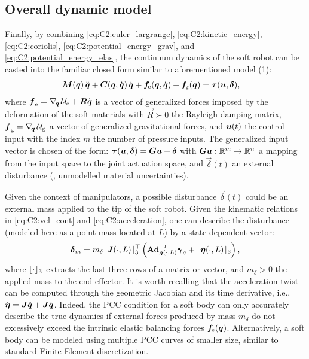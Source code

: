 \subsection{Overall dynamic model}
\noindent Finally, by combining \eqref{eq:C2:euler_largrange}, \eqref{eq:C2:kinetic_energy}, \eqref{eq:C2:coriolis}, \eqref{eq:C2:potential_energy_grav}, and \eqref{eq:C2:potential_energy_elas}, the continuum dynamics of the soft robot can be casted into the familiar closed form
\cite{DellaSantina2020,Boyer2021,Renda2018} similar to aforementioned model (1):
%
\begin{align}
\boldsymbol{M}({\boldsymbol{q}})\,{\ddot{\boldsymbol{q}}} + \boldsymbol{C}({\boldsymbol{q}},{\dot{\boldsymbol{q}}})\,{\dot{\boldsymbol{q}}} + {\boldsymbol{f}}\!_{\scriptstyle\textrm{e}}({\boldsymbol{q}},{\dot{\boldsymbol{q}}}) + {\boldsymbol{f}}\!_{\scriptstyle\textrm{g}}({\boldsymbol{q}}) & = \boldsymbol{\tau}({\boldsymbol{u}},\boldsymbol{\delta}),
\label{eq:C2:dynamic_model}
\end{align}
%
where ${\boldsymbol{f}}_{\scriptstyle\textrm{e}} = \nabla_{\!{\boldsymbol{q}}}\,\mathcal{U}_{\textrm{e}} + \boldsymbol{R}{\dot{\boldsymbol{q}}}$ is a vector of generalized forces imposed by the deformation of the soft materials with $\vec{R} \succ 0$ the Rayleigh damping matrix,
$\boldsymbol{f}_{\scriptstyle\textrm{g}} = \nabla_{\!{\boldsymbol{q}}}\, \mathcal{U}_{\scriptstyle\textrm{g}}$ a vector of generalized gravitational forces, and
${\boldsymbol{u}}(t)$ the control input with the index
$m$ the number of pressure inputs. The generalized input vector is chosen of the form:
$\boldsymbol{\tau}({\boldsymbol{u}},\boldsymbol{\delta}) = \boldsymbol{G}{\boldsymbol{u}} + \boldsymbol{\delta}$ with $\boldsymbol{G} {\boldsymbol{u}}: \mathbb{R}^m \to \mathbb{R}^n$ a mapping from the input space to the joint actuation space, and $\vec{\delta}(t)$ an external disturbance (\eg, unmodelled material uncertainties).
%
\begin{rmk}
Given the context of manipulators, a possible disturbance $\vec{\delta}(t)$ could be an external mass applied to the tip of the soft robot. Given the kinematic relations in \eqref{eq:C2:vel_cont} and \eqref{eq:C2:acceleration}, one can describe the disturbance (modeled here as a point-mass located at $L$) by a state-dependent vector:
%
\begin{equation}
\vec{\delta}_m = m_\delta \floor{\JB(\cdot,L)}_3^\top\left({\normalfont \Ad}_{\gB(\cdot,L)}\inv\gammaB_g + \floor{\dot{\etaB}(\cdot,L)}_3 \right),
\label{eq:delta_payload}
\end{equation}
%
where $\lfloor\cdot\rfloor_3$ extracts the last three rows of a matrix or vector, and $m_\delta > 0$ the applied mass to the end-effector. It is worth recalling that the acceleration twist can be computed through the geometric Jacobian and its time derivative, i.e., $\dot{{\boldsymbol{\eta}}} = {\boldsymbol{J}}{\ddot{\boldsymbol{q}}} + {\boldsymbol{J}}{\dot{\boldsymbol{q}}}$. Indeed, the PCC condition for a soft body can only accurately describe the true dynamics if external forces produced by mass $m_\delta$ do not excessively exceed the intrinsic elastic balancing forces $\boldsymbol{f}\!_{\scriptstyle\textrm{e}}({\boldsymbol{q}})$. Alternatively, a soft body can be modeled using multiple PCC curves of smaller size, similar to standard Finite Element discretization.
\end{rmk}

